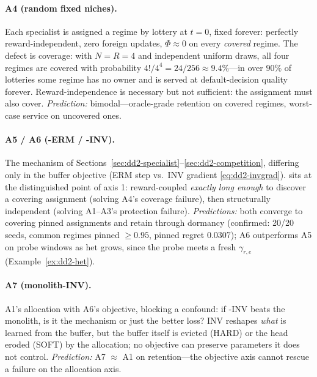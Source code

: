 \paragraph{A4 (random fixed niches).} Each specialist is assigned a regime
by lottery at $t = 0$, fixed forever: perfectly reward-independent, zero
foreign updates, $\Phi \approx 0$ on every \emph{covered} regime. The defect
is coverage: with $N = R = 4$ and independent uniform draws, all four
regimes are covered with probability $4!/4^4 = 24/256 \approx 9.4\%$---in
over $90\%$ of lotteries some regime has no owner and is served at
default-decision quality forever. Reward-independence is necessary but not
sufficient: the assignment must also cover.
\emph{Prediction:} bimodal---oracle-grade retention on covered regimes,
worst-case service on uncovered ones.

\paragraph{A5 / A6 (\nm{}-ERM / \nm{}-INV).} The mechanism of
Sections~\ref{sec:dd2-specialist}--\ref{sec:dd2-competition}, differing only
in the buffer objective (ERM step vs.\ INV gradient \eqref{eq:dd2-invgrad}).
\nm{} sits at the distinguished point of axis 1: reward-coupled
\emph{exactly long enough} to discover a covering assignment (solving A4's
coverage failure), then structurally independent (solving A1--A3's
protection failure). \emph{Predictions:} both converge to covering pinned
assignments and retain through dormancy (confirmed: 20/20 seeds, common
regimes pinned $\ge 0.95$, pinned regret $0.0307$); A6 outperforms A5 on
probe windows as $\mathrm{het}$ grows, since the probe meets a fresh
$\gamma_{r,e}$ (Example~\ref{ex:dd2-het}).

\paragraph{A7 (monolith-INV).} A1's allocation with A6's objective, blocking
a confound: if \nm{}-INV beats the monolith, is it the mechanism or just the
better loss? INV reshapes \emph{what} is learned from the buffer, but the
buffer itself is evicted (HARD) or the head eroded (SOFT) by the allocation;
no objective can preserve parameters it does not control.
\emph{Prediction:} A7 $\approx$ A1 on retention---the objective axis cannot
rescue a failure on the allocation axis.

